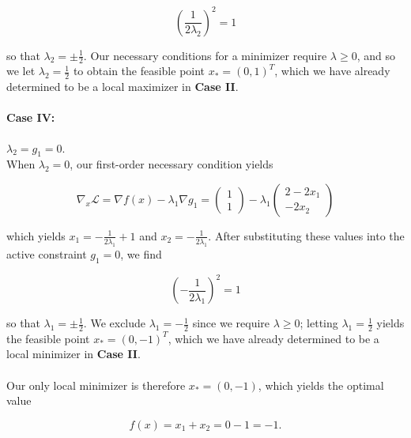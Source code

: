 \begin{solution}
    $$
    \left( \frac{1}{2 \lambda_2} \right)^2 = 1
    $$

    so that $\lambda_2 = \pm \frac{1}{2}$. Our necessary conditions for a minimizer require $\lambda \ge 0$, and so we 
    let $\lambda_2 = \frac{1}{2}$ to obtain the feasible point $x_* = (0, 1)^T$, which we have already determined to be 
    a local maximizer in \textbf{Case II}.

    \paragraph{Case IV:} $\lambda_2 = g_1 = 0.$ \ \\
    When $\lambda_2 = 0$, our first-order necessary condition yields

    $$
    \nabla_x \mathcal{L} = \nabla f(x) - \lambda_1 \nabla g_1 = \begin{pmatrix*}
        1 \\
        1
    \end{pmatrix*} - \lambda_1 \begin{pmatrix*}
        2 - 2 x_1 \\
        -2 x_2
    \end{pmatrix*}
    $$

    which yields $x_1 = -\frac{1}{2 \lambda_1} + 1$ and $x_2 = -\frac{1}{2 \lambda_1}$. After substituting these values 
    into the active constraint $g_1 = 0$, we find

    $$
    \left( -\frac{1}{2 \lambda_1} \right)^2 = 1
    $$

    so that $\lambda_1 = \pm \frac{1}{2}$. We exclude $\lambda_1 = -\frac{1}{2}$ since we require $\lambda \ge 0$; 
    letting $\lambda_1 = \frac{1}{2}$ yields the feasible point $x_* = (0, -1)^T$, which we have already determined to 
    be a local minimizer in \textbf{Case II}.
    \ \\\\
    Our only local minimizer is therefore $x_* = (0, -1)$, which yields the optimal value

    $$
    f(x) = x_1 + x_2 = 0 - 1 = -1.
    $$
    \ \\
\end{solution}